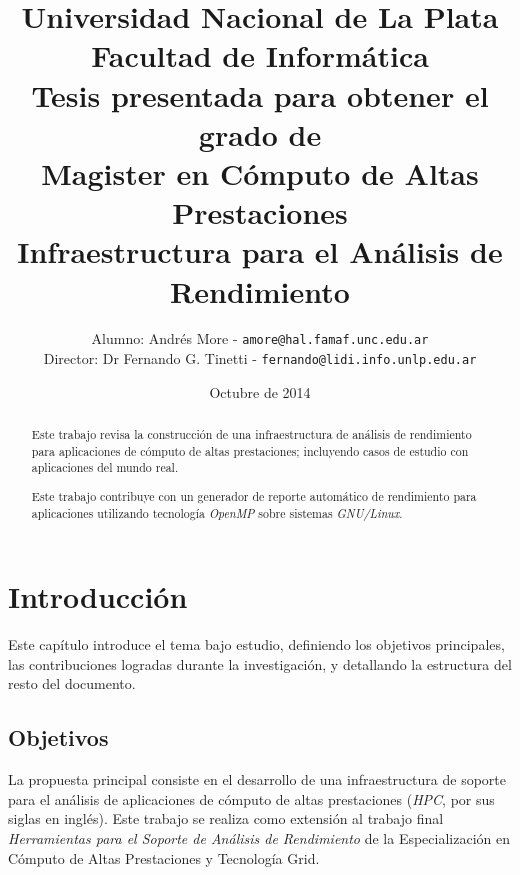 \documentclass[a4paper]{report}
\begin{document}
\setlength{\parindent}{0cm}
\renewcommand{\tablename}{Tabla}

\title{Universidad Nacional de La Plata\\Facultad de Informática\\ \bigskip
{\large Tesis presentada para obtener el grado de \\}  Magister en Cómputo de Altas Prestaciones\\ \bigskip
  Infraestructura para el Análisis de Rendimiento}

\author{
  Alumno: Andrés More - {\tt amore@hal.famaf.unc.edu.ar}\\
  Director: Dr Fernando G. Tinetti - {\tt fernando@lidi.info.unlp.edu.ar}
}

\date{Octubre de 2014}

\maketitle

\begin{abstract}
Este trabajo revisa la construcción de una infraestructura de análisis de rendimiento para aplicaciones de cómputo de altas prestaciones; incluyendo casos de estudio con aplicaciones del mundo real.

\bigskip

Este trabajo contribuye con un generador de reporte automático de rendimiento para aplicaciones utilizando tecnología {\it OpenMP} sobre sistemas {\it GNU/Linux}.
\end{abstract}

\tableofcontents

\chapter{Introducción}

Este capítulo introduce el tema bajo estudio, definiendo los objetivos principales, las contribuciones logradas durante la investigación, y detallando la estructura del resto del documento.

\section{Objetivos}

La propuesta principal consiste en el desarrollo de una infraestructura de soporte para el análisis de aplicaciones de cómputo de altas prestaciones ({\it HPC}, por sus siglas en inglés). Este trabajo se realiza como extensión al trabajo final {\it Herramientas para el Soporte de Análisis de Rendimiento} de la Especialización en Cómputo de Altas Prestaciones y Tecnología Grid.
\end{document}
